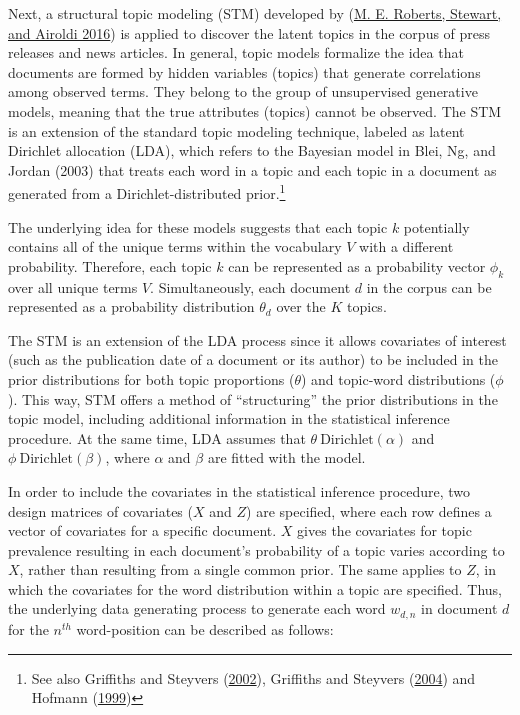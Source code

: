 \documentclass[
  12pt,
]{article}
\begin{document}
Next, a structural topic modeling (STM) developed by
(\protect\hyperlink{ref-roberts_model_2016}{M. E. Roberts, Stewart, and
Airoldi 2016}) is applied to discover the latent topics in the corpus of
press releases and news articles. In general, topic models formalize the
idea that documents are formed by hidden variables (topics) that
generate correlations among observed terms. They belong to the group of
unsupervised generative models, meaning that the true attributes
(topics) cannot be observed. The STM is an extension of the standard
topic modeling technique, labeled as latent Dirichlet allocation (LDA),
which refers to the Bayesian model in Blei, Ng, and Jordan (2003) that
treats each word in a topic and each topic in a document as generated
from a Dirichlet-distributed prior.\footnote{See also Griffiths and
  Steyvers (\protect\hyperlink{ref-griffiths_probabilistic_2002}{2002}),
  Griffiths and Steyvers
  (\protect\hyperlink{ref-griffiths_finding_2004}{2004}) and Hofmann
  (\protect\hyperlink{ref-hofmann_probabilistic_1999}{1999})}

The underlying idea for these models suggests that each topic \(k\)
potentially contains all of the unique terms within the vocabulary \(V\)
with a different probability. Therefore, each topic \(k\) can be
represented as a probability vector \(\phi_k\) over all unique terms
\(V\). Simultaneously, each document \(d\) in the corpus can be
represented as a probability distribution \(\theta_d\) over the \(K\)
topics.

The STM is an extension of the LDA process since it allows covariates of
interest (such as the publication date of a document or its author) to
be included in the prior distributions for both topic proportions
(\(\theta\)) and topic-word distributions (\(\phi\)). This way, STM
offers a method of ``structuring'' the prior distributions in the topic
model, including additional information in the statistical inference
procedure. At the same time, LDA assumes that
\(\theta ~ \text{Dirichlet}(\alpha)\) and
\(\phi ~ \text{Dirichlet}(\beta)\), where \(\alpha\) and \(\beta\) are
fitted with the model.

In order to include the covariates in the statistical inference
procedure, two design matrices of covariates (\(X\) and \(Z\)) are
specified, where each row defines a vector of covariates for a specific
document. \(X\) gives the covariates for topic prevalence resulting in
each document's probability of a topic varies according to \(X\), rather
than resulting from a single common prior. The same applies to \(Z\), in
which the covariates for the word distribution within a topic are
specified. Thus, the underlying data generating process to generate each
word \(w_{d,n}\) in document \(d\) for the \(n^{th}\) word-position can
be described as follows:
\end{document}
